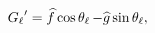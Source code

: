 $\mathop{G_{\ell}\/}\nolimits'=\widehat{f}\mathop{\cos\/}\nolimits\mathop{{%
\theta_{\ell}}\/}\nolimits-\widehat{g}\mathop{\sin\/}\nolimits\mathop{{\theta_%
{\ell}}\/}\nolimits,$